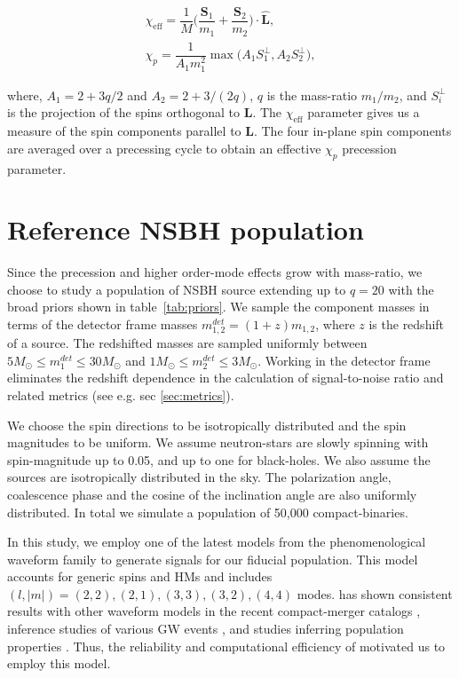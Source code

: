 \begin{align}
    \chi_{\text{eff}} = \dfrac{1}{M}\Bigg(\dfrac{\textbf{S}_1}{m_1}+\dfrac{\textbf{S}_2}{m_2}\Bigg)\cdot\hat{\textbf{L}}, \label{eq:chi_eff}\\
    \chi_{p} = \dfrac{1}{A_1m_1^2}\max\Big(A_1 S_1^{\perp},A_2 S_2^{\perp}\Big), \label{eq:chi_P}
\end{align} 

where, $A_1=2+3q/2$ and $A_2 = 2 + 3/(2q)$, $q$ is the mass-ratio $m_1/m_2$, and $S_i^{\perp}$ is the projection of the spins orthogonal to $\textbf{L}$. The $\chi_{\text{eff}}$ parameter gives us a measure of the spin components parallel to $\textbf{L}$. The four in-plane spin components are averaged over a precessing cycle to obtain an effective $\chi_p$ precession parameter.

\section{ Reference NSBH population } \label{sec:ref_pop}
Since the precession and higher order-mode effects grow with mass-ratio, we choose to study a population of NSBH source extending up to $q = 20$ with the broad priors shown in table~\ref{tab:priors}. We sample the component masses in terms of the detector frame masses $m_{1,2}^{det} = (1+z)m_{1,2}$, where $z$ is the redshift of a source. The redshifted masses are sampled uniformly between $5 M_{\odot} \leq m_1^{det} \leq 30 M_{\odot}$ and $1 M_{\odot} \leq m_2^{det} \leq 3 M_{\odot}$. Working in the detector frame eliminates the redshift dependence in the calculation of signal-to-noise ratio and related metrics (see e.g. sec \ref{sec:metrics}).


We choose the spin directions to be isotropically distributed and the spin magnitudes to be uniform. We assume neutron-stars are slowly spinning with spin-magnitude up to 0.05, and up to one for black-holes. We also assume the sources are isotropically distributed in the sky. The polarization angle, coalescence phase and the cosine of the inclination angle are also uniformly distributed. In total we simulate a population of 50,000 compact-binaries.

In this study, we employ one of the latest models from the phenomenological waveform family  \cite{Pratten:2020ceb} to generate signals for our fiducial population. This model accounts for generic spins and HMs and includes $(l, |m|) = (2, 2), (2, 1), (3, 3), (3, 2), (4, 4)$ modes.  has shown consistent results with other waveform models in the recent compact-merger catalogs \cite{LIGOScientific:2021djp, Nitz:2021uxj, Olsen:2022pin}, inference studies of various GW events \cite{Estelles:2021jnz, Krishnendu:2021cyi}, and studies inferring population properties \cite{Tiwari:2021yvr, Zhu:2021jbw}. Thus, the reliability and computational efficiency of  motivated us to employ this model.  

